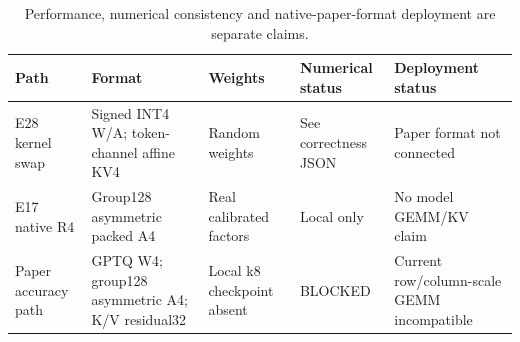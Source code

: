 \begin{table}[t]
\centering
\small
\caption{Performance, numerical consistency and native-paper-format deployment are separate claims.}
\begin{tabular}{lllll}
\toprule
Path & Format & Weights & Numerical status & Deployment status \\
\midrule
E28 kernel swap & Signed INT4 W/A; token-channel affine KV4 & Random weights & See correctness JSON & Paper format not connected \\
E17 native R4 & Group128 asymmetric packed A4 & Real calibrated factors & Local only & No model GEMM/KV claim \\
Paper accuracy path & GPTQ W4; group128 asymmetric A4; K/V residual32 & Local k8 checkpoint absent & BLOCKED & Current row/column-scale GEMM incompatible \\
\bottomrule
\end{tabular}
\end{table}
